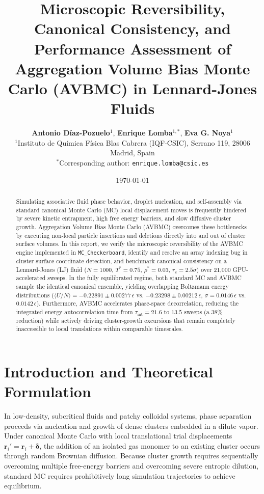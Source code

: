 \documentclass[11pt,a4paper]{article}
\title{\textbf{\Large Microscopic Reversibility, Canonical Consistency, and Performance Assessment of Aggregation Volume Bias Monte Carlo (AVBMC) in Lennard-Jones Fluids}}
\author{\textbf{Antonio Díaz-Pozuelo}$^{1}$, \textbf{Enrique Lomba}$^{1,*}$, \textbf{Eva G. Noya}$^{1}$ \\[0.5em]
\small $^{1}$Instituto de Química Física Blas Cabrera (IQF-CSIC), Serrano 119, 28006 Madrid, Spain \\
\small $^*$Corresponding author: \texttt{enrique.lomba@csic.es}}
\date{\today}
\begin{document}
\maketitle

\begin{abstract}
Simulating associative fluid phase behavior, droplet nucleation, and self-assembly via standard canonical Monte Carlo (MC) local displacement moves is frequently hindered by severe kinetic entrapment, high free energy barriers, and slow diffusive cluster growth. Aggregation Volume Bias Monte Carlo (AVBMC) overcomes these bottlenecks by executing non-local particle insertions and deletions directly into and out of cluster surface volumes. In this report, we verify the microscopic reversibility of the AVBMC engine implemented in \texttt{MC\_Checkerboard}, identify and resolve an array indexing bug in cluster surface coordinate detection, and benchmark canonical consistency on a Lennard-Jones (LJ) fluid ($N = 1000$, $T^* = 0.75$, $\rho^* = 0.03$, $r_c = 2.5\sigma$) over 21,000 GPU-accelerated sweeps. In the fully equilibrated regime, both standard MC and AVBMC sample the identical canonical ensemble, yielding overlapping Boltzmann energy distributions ($\langle U/N \rangle = -0.22891 \pm 0.00277\,\epsilon$ vs. $-0.23298 \pm 0.00212\,\epsilon$, $\sigma = 0.0146\,\epsilon$ vs. $0.0142\,\epsilon$). Furthermore, AVBMC accelerates phase-space decorrelation, reducing the integrated energy autocorrelation time from $\tau_{\mathrm{int}} = 21.6$ to $13.5$ sweeps (a $38\%$ reduction) while actively driving cluster-growth excursions that remain completely inaccessible to local translations within comparable timescales.
\end{abstract}

\section{Introduction and Theoretical Formulation}

In low-density, subcritical fluids and patchy colloidal systems, phase separation proceeds via nucleation and growth of dense clusters embedded in a dilute vapor. Under canonical Monte Carlo with local translational trial displacements $\mathbf{r}_i' = \mathbf{r}_i + \bm{\delta}$, the addition of an isolated gas monomer to an existing cluster occurs through random Brownian diffusion. Because cluster growth requires sequentially overcoming multiple free-energy barriers and overcoming severe entropic dilution, standard MC requires prohibitively long simulation trajectories to achieve equilibrium.
\end{document}
